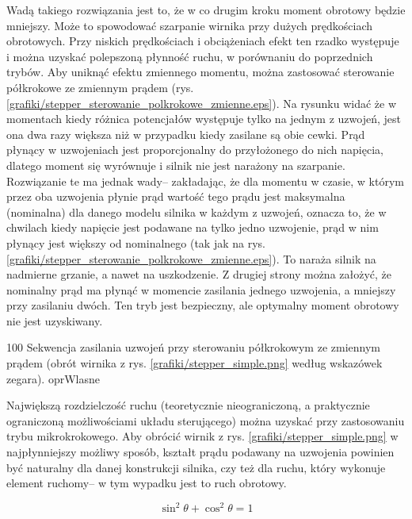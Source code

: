 Wadą takiego rozwiązania jest to, że w co drugim kroku moment obrotowy będzie mniejszy. Może to spowodować szarpanie wirnika przy dużych prędkościach obrotowych. Przy niskich prędkościach i obciążeniach efekt ten rzadko występuje i można uzyskać polepszoną płynność ruchu, w porównaniu do poprzednich trybów. Aby uniknąć efektu zmiennego momentu, można zastosować sterowanie półkrokowe ze zmiennym prądem (rys. \ref{grafiki/stepper_sterowanie_polkrokowe_zmienne.eps}). Na rysunku widać że w momentach kiedy różnica potencjałów występuje tylko na jednym z uzwojeń, jest ona dwa razy większa niż w przypadku kiedy zasilane są obie cewki. Prąd płynący w uzwojeniach jest proporcjonalny do przyłożonego do nich napięcia, dlatego moment się wyrównuje i silnik nie jest narażony na szarpanie. Rozwiązanie te ma jednak wady-- zakładając, że dla momentu w czasie, w którym przez oba uzwojenia płynie prąd wartość tego prądu jest maksymalna (nominalna) dla danego modelu silnika w każdym z uzwojeń, oznacza to, że w chwilach kiedy napięcie jest podawane na tylko jedno uzwojenie, prąd w nim płynący jest większy od nominalnego (tak jak na rys. \ref{grafiki/stepper_sterowanie_polkrokowe_zmienne.eps}). To naraża silnik na nadmierne grzanie, a nawet na uszkodzenie. Z drugiej strony można założyć, że nominalny prąd ma płynąć w momencie zasilania jednego uzwojenia, a mniejszy przy zasilaniu dwóch. Ten tryb jest bezpieczny, ale optymalny moment obrotowy nie jest uzyskiwany.

		{100}
		{Sekwencja zasilania uzwojeń przy sterowaniu półkrokowym ze zmiennym prądem (obrót wirnika z rys. \ref{grafiki/stepper_simple.png} według wskazówek zegara).}
		{oprWlasne}
		

Największą rozdzielczość ruchu (teoretycznie nieograniczoną, a praktycznie ograniczoną możliwościami układu sterującego) można uzyskać przy zastosowaniu trybu mikrokrokowego. Aby obrócić wirnik z rys. \ref{grafiki/stepper_simple.png} w najpłynniejszy możliwy sposób, kształt prądu podawany na uzwojenia powinien być naturalny dla danej konstrukcji silnika, czy też dla ruchu, który wykonuje element ruchomy-- w tym wypadku jest to ruch obrotowy. 

\begin{equation} \label{eq:stepper2}
	\sin^2\theta + \cos^2\theta = 1
\end{equation}

